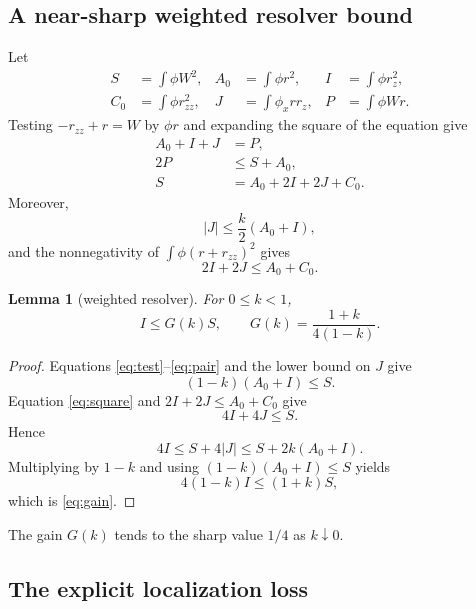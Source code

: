 \documentclass[11pt]{article}
\newcommand{\abs}[1]{\left\lvert #1\right\rvert}
\newtheorem{lemma}{Lemma}
\begin{document}
\subsection{A near-sharp weighted resolver bound}

Let
\[
\begin{aligned}
 S&=\int\phi W^2,&
 A_0&=\int\phi r^2,&
 I&=\int\phi r_z^2,\\
 C_0&=\int\phi r_{zz}^2,&
 J&=\int\phi_xrr_z,&
 P&=\int\phi Wr.
\end{aligned}
\]
Testing \(-r_{zz}+r=W\) by \(\phi r\) and expanding the square of the
equation give
\begin{align}
 A_0+I+J&=P,                                           \label{eq:test}\\
 2P&\le S+A_0,                                         \label{eq:pair}\\
 S&=A_0+2I+2J+C_0.                                    \label{eq:square}
\end{align}
Moreover,
\[
 \abs J\le\frac{k}{2}(A_0+I),
\]
and the nonnegativity of
\(\int\phi(r+r_{zz})^2\) gives
\[
 2I+2J\le A_0+C_0.
\]

\begin{lemma}[weighted resolver]
For \(0\le k<1\),
\begin{equation}
 I\le G(k)S,\qquad
 G(k)=\frac{1+k}{4(1-k)}.                              \label{eq:gain}
\end{equation}
\end{lemma}

\begin{proof}
Equations \eqref{eq:test}--\eqref{eq:pair} and the lower bound on \(J\)
give
\[
 (1-k)(A_0+I)\le S.
\]
Equation \eqref{eq:square} and \(2I+2J\le A_0+C_0\) give
\[
 4I+4J\le S.
\]
Hence
\[
 4I\le S+4\abs J
 \le S+2k(A_0+I).
\]
Multiplying by \(1-k\) and using
\((1-k)(A_0+I)\le S\) yields
\[
 4(1-k)I\le(1+k)S,
\]
which is \eqref{eq:gain}.
\end{proof}

The gain \(G(k)\) tends to the sharp value \(1/4\) as \(k\downarrow0\).

\subsection{The explicit localization loss}
\end{document}
